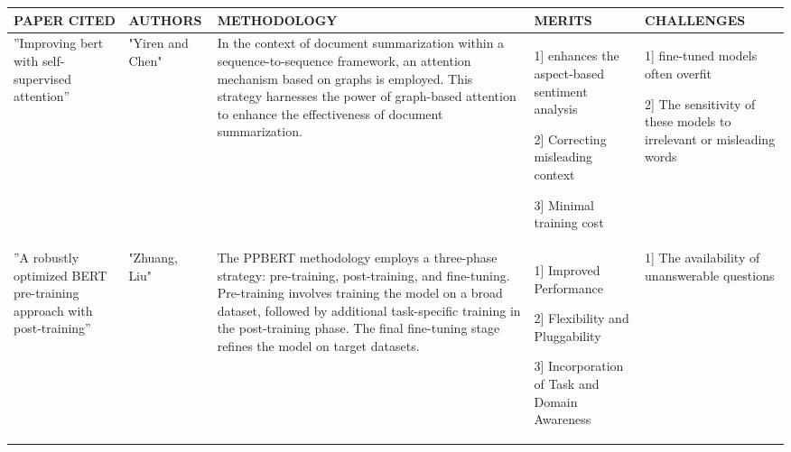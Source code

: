 \documentclass[fleqn,10pt]{thescipub} %
\begin{document}
\begin{table}
\begin{center}
 \centering
  \small %
    \begin{tabular}{ |p{2cm}|p{1.5cm}|p{3.75cm}|p{3.75cm}|p{4cm}| }
\hline
\centering PAPER CITED & \centering  AUTHORS & \centering METHODOLOGY &  \centering MERITS &  \centering CHALLENGES \arraybackslash \\ 
\hline
”Improving bert with self-supervised attention” & "Yiren and Chen" & In the context of document summarization within a sequence-to-sequence framework, an attention mechanism based on graphs is employed. This strategy harnesses the power of graph-based attention to enhance the effectiveness of document summarization. & 1] enhances the aspect-based sentiment analysis

2] Correcting misleading context

3] Minimal training cost  & 1] fine-tuned models often overfit

2] The sensitivity of these models to irrelevant or misleading words
\\
\hline
 ”A robustly optimized BERT pre-training approach with post-training” & "Zhuang, Liu" & The PPBERT methodology employs a three-phase strategy: pre-training, post-training, and fine-tuning. Pre-training involves training the model on a broad dataset, followed by additional task-specific training in the post-training phase. The final fine-tuning stage refines the model on target datasets. &  1] Improved Performance

2] Flexibility and Pluggability

3] Incorporation of Task and Domain Awareness & 1] The availability of unanswerable questions


\end{tabular}
\end{center}
\end{table}
\end{document}
